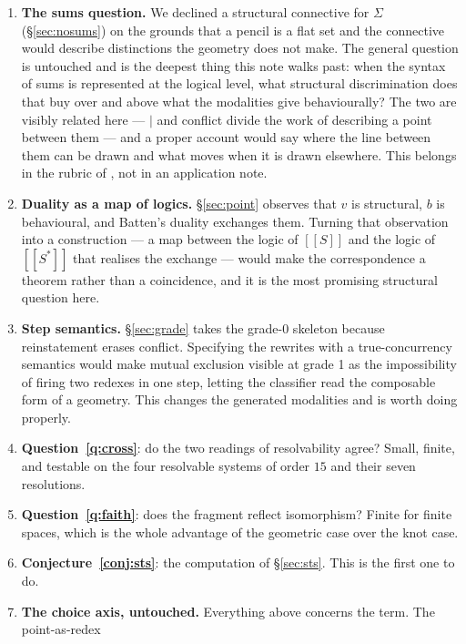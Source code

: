 \documentclass[11pt]{article}
\theoremstyle{plain}
\theoremstyle{definition}
\newcommand{\enc}[1]{[\![#1]\!]}
\newcommand{\bmid}{\mathbin{|}}
\begin{document}
\begin{enumerate}
\item \textbf{The sums question.} We declined a structural connective for $\Sigma$
      (\S\ref{sec:nosums}) on the grounds that a pencil is a flat set and the connective would
      describe distinctions the geometry does not make. The general question is untouched and is
      the deepest thing this note walks past: when the syntax of sums is represented at the logical
      level, what structural discrimination does that buy over and above what the modalities give
      behaviourally? The two are visibly related here --- $\bmid$ and conflict divide the work of
      describing a point between them --- and a proper account would say where the line between
      them can be drawn and what moves when it is drawn elsewhere. This belongs in the rubric of
      \cite{Omnibus}, not in an application note.
\item \textbf{Duality as a map of logics.} \S\ref{sec:point} observes that $v$ is structural, $b$ is
      behavioural, and Batten's duality exchanges them. Turning that observation into a construction
      --- a map between the logic of $\enc{S}$ and the logic of $\enc{S^{*}}$ that realises the
      exchange --- would make the correspondence a theorem rather than a coincidence, and it is the
      most promising structural question here.
\item \textbf{Step semantics.} \S\ref{sec:grade} takes the grade-0 skeleton because reinstatement
      erases conflict. Specifying the rewrites with a true-concurrency semantics would make mutual
      exclusion visible at grade 1 as the impossibility of firing two redexes in one step, letting
      the classifier read the composable form of a geometry. This changes the generated modalities
      and is worth doing properly.
\item \textbf{Question~\ref{q:cross}}: do the two readings of resolvability agree? Small,
      finite, and testable on the four resolvable systems of order $15$ and their seven
      resolutions.
\item \textbf{Question~\ref{q:faith}}: does the fragment reflect isomorphism? Finite for finite
      spaces, which is the whole advantage of the geometric case over the knot case.
\item \textbf{Conjecture~\ref{conj:sts}}: the computation of \S\ref{sec:sts}. This is the first one
      to do.
\item \textbf{The choice axis, untouched.} Everything above concerns the term. The point-as-redex

\end{enumerate}
\end{document}
